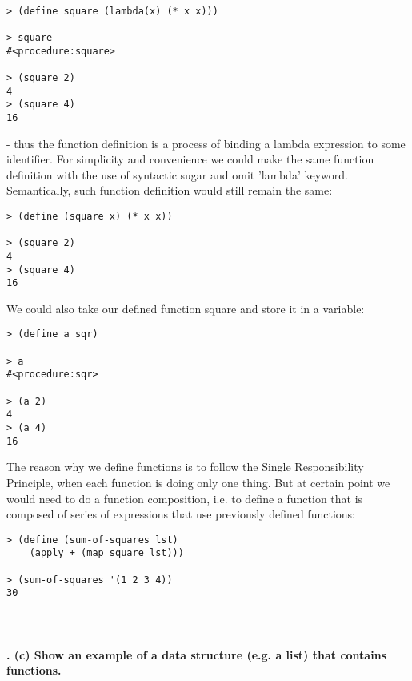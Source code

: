 \documentclass{article}
\begin{document}
\begin{verbatim} 
 
> (define square (lambda(x) (* x x)))

> square
#<procedure:square>

> (square 2)
4
> (square 4)
16
\end{verbatim}
- thus the function definition is a process of binding a lambda expression to some identifier. For simplicity and convenience we could make the same function definition with the use of syntactic sugar and omit 'lambda' keyword. Semantically, such function definition would still remain the same:

\begin{verbatim} 
> (define (square x) (* x x))

> (square 2)
4
> (square 4)
16
\end{verbatim}

We could also take our defined function square and store it in a variable:

\begin{verbatim} 
> (define a sqr)

> a
#<procedure:sqr>

> (a 2)
4
> (a 4)
16
\end{verbatim}

The reason why we define functions is to follow the Single Responsibility Principle, when each function is doing only one thing. But at certain point we would need to do a function composition, i.e. to define a function that is composed of series of expressions that use previously defined functions:

\begin{verbatim} 
> (define (sum-of-squares lst)
    (apply + (map square lst)))
    
> (sum-of-squares '(1 2 3 4))
30
\end{verbatim}

\paragraph{}\
\paragraph{. (c) Show an example of a data structure (e.g. a list) that contains functions.}\
\end{document}
